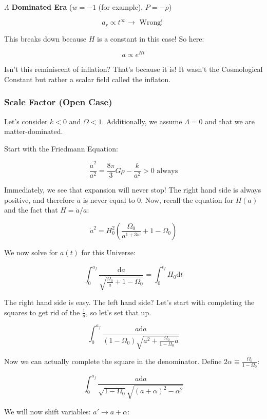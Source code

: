 \documentclass{article}
\newcommand{\be}{\begin{equation}}
\newcommand{\ee}{\end{equation}}
\begin{document}
$\Lambda$ \textbf{Dominated Era} ($w=-1$ (for example), $P=-\rho$)

\begin{equation}
    a_{r}\propto t^{\infty} \rightarrow \text{ Wrong! }
\end{equation}

This breaks down because $H$ is a constant in this case! So here:

\be
    a \propto e^{Ht}
\ee

Isn't this reminiscent of inflation? That's because it is! It wasn't the Cosmological Constant but rather a scalar field called the inflaton.  


\subsubsection{Scale Factor (Open Case)}

Let's consider $k<0$ and $\Omega <1$. Additionally, we assume $\Lambda =0$ and that we are matter-dominated. 

Start with the Friedmann Equation:

\be
\frac{\dot a^2}{a^2} = \frac{8\pi}{3}G\rho - \frac{k}{a^2} > 0 \text{ always}
\ee

Immediately, we see that expansion will never stop! The right hand side is always positive, and therefore $\dot a$ is never equal to $0$. Now, recall the equation for $H(a)$ and the fact that $H = \dot{a}/a$:

\be
\dot{a}^2 = H_0^2 \left(\frac{\Omega_0}{a^{1+3w}} + 1 - \Omega_0\right)
\ee

We now solve for $a(t)$ for this Universe:

\be
\int_0^{a_f} \frac{\mathrm{d}a}{\sqrt{\frac{\Omega_0}{a} + 1 - \Omega_0}} = \int_0^{t_f} H_0 \mathrm{d}t
\ee

The right hand side is easy. The left hand side? Let's start with completing the squares to get rid of the $\frac{1}{a}$, so let's set that up.

\be
\int_0^{a_f} \frac{a \mathrm{d}a}{\left(1-\Omega_0\right)\sqrt{a^2 + \frac{\Omega_0}{1-\Omega_0}a }}
\ee

Now we can actually complete the square in the denominator. Define $2\alpha\equiv \frac{\Omega_0}{1-\Omega_0}$:

\be
\int_0^{a_f} \frac{a\mathrm{d}a}{\sqrt{1-\Omega_0} \sqrt{\left(a + \alpha\right)^2 - \alpha^2}}
\ee

We will now shift variables: $a\prime \rightarrow a + \alpha$:
\end{document}
